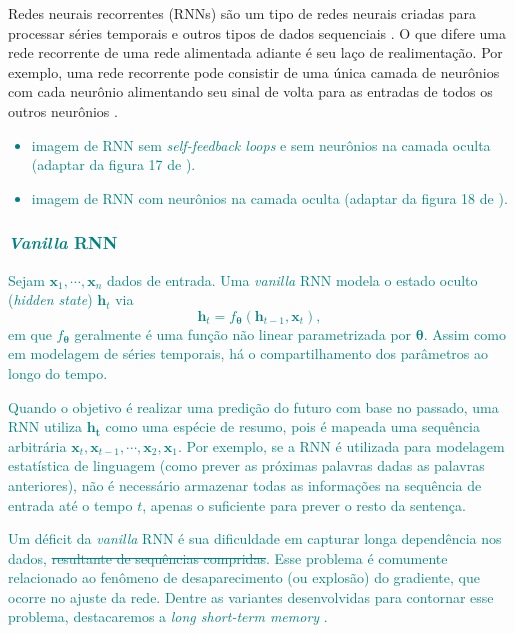 \documentclass{automatextcc}
\newcommand{\nico}[1]{\textcolor{teal}{#1}}
\newcommand{\bs}[1]{\boldsymbol{#1}}
\begin{document}
Redes neurais recorrentes (RNNs) são um tipo de redes neurais criadas para processar séries temporais e outros tipos de dados sequenciais \citep{fan2021}. O que difere uma rede recorrente de uma rede alimentada adiante é seu laço de realimentação. Por exemplo, uma rede recorrente pode consistir de uma única camada de neurônios com cada neurônio alimentando seu sinal de volta para as entradas de todos os outros neurônios \citep{haykin2009}. 

\nico{
\begin{itemize}
    \item imagem de RNN sem \textit{self-feedback loops} e sem neurônios na camada oculta (adaptar da figura 17 de \citet{haykin2009}).
    \item imagem de RNN com neurônios na camada oculta (adaptar da figura 18 de \citet{haykin2009}).
\end{itemize}
}

\subsubsection{\nico{\textit{Vanilla} RNN}}
\nico{
Sejam $\bs{x}_{1},\cdots,\bs{x}_{n}$ dados de entrada. Uma \textit{vanilla} RNN modela o estado oculto (\textit{hidden state}) $\bs{h}_{t}$ via
\begin{equation*}
    \bs{h}_t = f_{\bs{{\theta}}} (\bs{h}_{t-1}, \bs{x}_{t}),    
\end{equation*}
em que $f_{\bs{\theta}}$ geralmente é uma função não linear parametrizada por $\bs{\theta}$. Assim como em modelagem de séries temporais, há o compartilhamento dos parâmetros ao longo do tempo.
}

\nico{
Quando o objetivo é realizar uma predição do futuro com base no passado, uma RNN utiliza $\bs{h_t}$ como uma espécie de resumo, pois é mapeada uma sequência arbitrária $\bs{x}_{t},\bs{x}_{t-1},\cdots,\bs{x}_{2},\bs{x}_{1}$. Por exemplo, se a RNN é utilizada para modelagem estatística de linguagem (como prever as próximas palavras dadas as palavras anteriores), não é necessário armazenar todas as informações na sequência de entrada até o tempo $t$, apenas o suficiente para prever o resto da sentença.
}

\nico{
Um déficit da \textit{vanilla} RNN é sua dificuldade em capturar longa dependência nos dados, \sout{resultante de sequências compridas}. Esse problema é comumente relacionado ao fenômeno de desaparecimento (ou explosão) do gradiente, que ocorre no ajuste da rede. Dentre as variantes desenvolvidas para contornar esse problema, destacaremos a \textit{long short-term memory} \citep{goodfellow2016, fan2021}.
}
\end{document}
